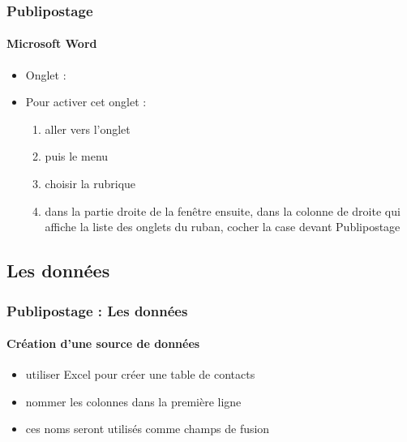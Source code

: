 \documentclass[xcolor=table]{beamer}
\begin{document}
\begin{frame}
\frametitle{Publipostage}
\framesubtitle{Microsoft Word}
 
\begin{itemize}
	\item Onglet : 
	\item Pour activer cet onglet : 
	\begin{enumerate}
		\item aller vers l'onglet 
		\item puis le menu 
		\item choisir la rubrique 
		\item dans la partie droite de la fenêtre ensuite, dans la colonne de droite qui affiche la liste des onglets du ruban, cocher la case devant Publipostage
	\end{enumerate}
\end{itemize}



\end{frame}

\subsection{Les données}

\begin{frame}
\frametitle{Publipostage : Les données}
\framesubtitle{Création d'une source de données}

\begin{minipage}{0.40\textwidth}
	\begin{itemize}
		\item utiliser Excel pour créer une table de contacts
		\item nommer les colonnes dans la première ligne
		\item ces noms seront utilisés comme champs de fusion
	\end{itemize}
\end{minipage}
\begin{minipage}{0.59\textwidth}
\end{minipage}

\end{frame}
\end{document}
